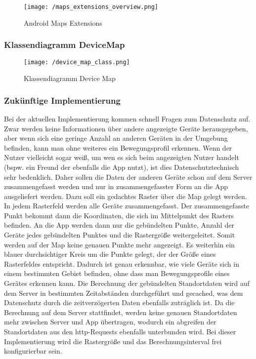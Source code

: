 \begin{figure}[H]
\centering
\texttt{[image: /maps\_extensions\_overview.png]}
\caption[User Interface: Android Maps Extensions]{Android Maps Extensions}
\label{fig:mapsExtensions}
\end{figure}

\subsubsection{Klassendiagramm DeviceMap}
\begin{figure}[H]
\centering
\texttt{[image: /device\_map\_class.png]}
\caption[User Interface: Klassendiagramm Device Map]{Klassendiagramm Device Map}
\label{fig:deviceMapClass}
\end{figure}

\subsubsection{Zukünftige Implementierung}
Bei der aktuellen Implementierung kommen schnell Fragen zum Datenschutz auf. Zwar werden keine Informationen über andere angezeigte Geräte herausgegeben, aber wenn sich eine geringe Anzahl an anderen Geräten in der Umgebung befinden, kann man ohne weiteres ein Bewegungsprofil erkennen. Wenn der Nutzer vielleicht sogar weiß, um wen es sich beim angezeigten Nutzer handelt (bspw. ein Freund der ebenfalls die App nutzt), ist dies Datenschutztechnisch sehr bedenklich. Daher sollen die Daten der anderen Geräte schon auf dem Server zusammengefasst werden und nur in zusammengefasster Form an die App ausgeliefert werden. Dazu soll ein gedachtes Raster über die Map gelegt werden. In jedem Rasterfeld werden alle Geräte zusammengefasst. Der zusammengefasste Punkt bekommt dann die Koordinaten, die sich im Mittelpunkt des Rasters befinden. An die App werden dann nur die gebündelten Punkte, Anzahl der Geräte jedes gebündelten Punktes und die Rastergröße weitergeleitet. Somit werden auf der Map keine genauen Punkte mehr angezeigt. Es weiterhin ein blauer durchsichtiger Kreis um die Punkte gelegt, der der Größe eines Rasterfeldes entspricht. Dadurch ist genau erkennbar, wie viele Geräte sich in einem bestimmten Gebiet befinden, ohne dass man Bewegungsprofile eines Gerätes erkennen kann. Die Berechnung der gebündelten Standortdaten wird auf dem Server in bestimmten Zeitabständen durchgeführt und gecached, was dem Datenschutz durch die zeitverzögerten Daten ebenfalls zuträglich ist. Da die Berechnung auf dem Server stattfindet, werden keine genauen Standortdaten mehr zwischen Server und App übertragen, wodurch ein abgreifen der Standortdaten aus den http-Requests ebenfalls unterbunden wird. Bei dieser Implementierung wird die Rastergröße und das Berechnungsinterval frei konfigurierbar sein.

